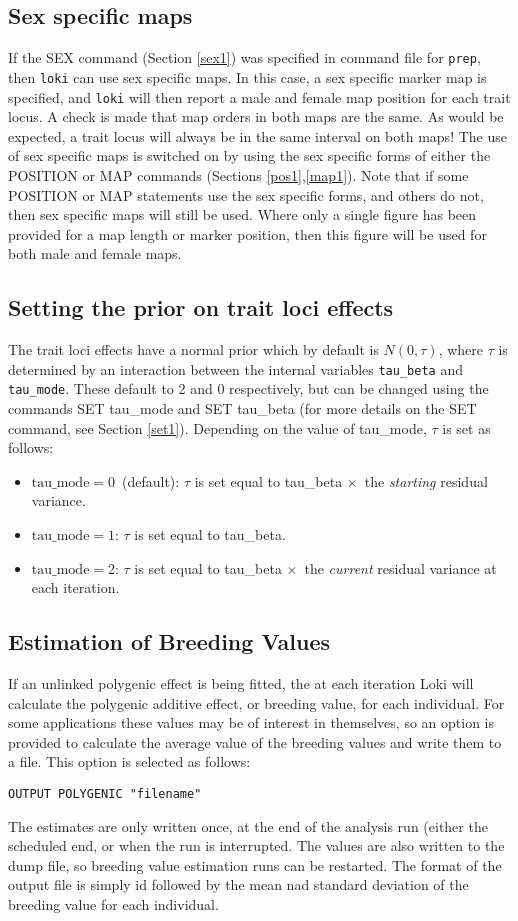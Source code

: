 \documentclass[10pt,a4paper]{article}
\newcommand{\Prep}{\texttt{prep}\xspace}
\newcommand{\Loki}{\texttt{loki}\xspace}
\begin{document}
\subsection{Sex specific maps}\label{sex_spec}
If the SEX command (Section \ref{sex1}) was specified in command file for
\Prep, then \Loki can use sex specific maps.  In this case, a sex specific
marker map is specified, and \Loki will then report a male and female map
position for each trait locus.  A check is made that map orders in both maps
are the same.  As would be expected, a trait locus will always be in the
same interval on both maps!  The use of sex specific maps is switched on by
using the sex specific forms of either the POSITION or MAP commands
(Sections \ref{pos1},\ref{map1}).  Note that if some POSITION or MAP
statements use the sex specific forms, and others do not, then sex specific
maps will still be used.  Where only a single figure has been provided for a
map length or marker position, then this figure will be used for both male
and female maps.
\subsection{Setting the prior on trait loci effects}\label{prior1}
The trait loci effects have a normal prior which by default is
$N(0,\tau)$, where $\tau$ is determined by an interaction between the
internal variables \verb+tau_beta+ and \verb+tau_mode+.  These default to
2 and 0 respectively, but can be changed using the commands SET
tau\_mode and SET tau\_beta (for more details on the SET command, see
Section \ref{set1}).  Depending on the value of tau\_mode, $\tau$ is
set as follows:
{\raggedright
\begin{itemize}
\item $\text{tau\_mode}=0$\ (default): $\tau$ is set equal to tau\_beta $\times$\ the \emph{starting}
residual variance.
\item $\text{tau\_mode}=1$: $\tau$ is set equal to tau\_beta.
\item $\text{tau\_mode}=2$: $\tau$ is set equal to tau\_beta $\times$\ the
\emph{current} residual variance at each iteration.
\end{itemize}}
\subsection{Estimation of Breeding Values}
If an unlinked polygenic effect is being fitted, the at each iteration Loki
will calculate the polygenic additive effect, or breeding value, for each
individual.  For some applications these values may be of interest in
themselves, so an option is provided to calculate the average value of the
breeding values and write them to a file.  This option is selected as follows:
\begin{verbatim}
OUTPUT POLYGENIC "filename"
\end{verbatim}
The estimates are only written once, at the end of the analysis run (either
the scheduled end, or when the run is interrupted.  The values are also
written to the dump file, so breeding value estimation runs can be
restarted.  The format of the output file is simply id followed by the mean
nad standard deviation of the breeding value for each individual.
\end{document}
